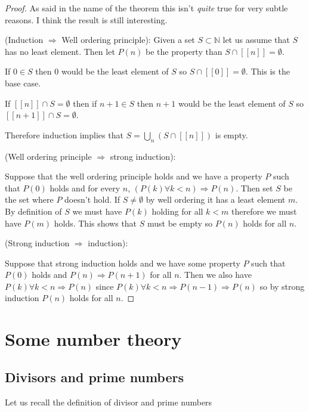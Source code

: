 \documentclass[
]{book}
\theoremstyle{definition}
\theoremstyle{definition}
\theoremstyle{definition}
\theoremstyle{definition}
\theoremstyle{remark}
\begin{document}
\begin{proof}
As said in the name of the theorem this isn't \emph{quite} true for very subtle reasons. I think the result is still interesting.

(Induction \(\Rightarrow\) Well ordering principle): Given a set \(S \subset \mathbb{N}\) let us assume that \(S\) has no least element. Then let \(P(n)\) be the property than \(S \cap [[n]]= \emptyset\).

If \(0 \in S\) then \(0\) would be the least element of \(S\) so \(S \cap [[0]]= \emptyset\). This is the base case.

If \([[n]] \cap S = \emptyset\) then if \(n+1 \in S\) then \(n+1\) would be the least element of \(S\) so \([[n+1]] \cap S = \emptyset\).

Therefore induction implies that \(S = \bigcup_n (S \cap [[n]])\) is empty.

(Well ordering principle \(\Rightarrow\) strong induction):

Suppose that the well ordering principle holds and we have a property \(P\) such that \(P(0)\) holds and for every \(n\), \((P(k) \forall k<n) \Rightarrow P(n)\). Then set \(S\) be the set where \(P\) doesn't hold. If \(S \neq \emptyset\) by well ordering it has a least element \(m\). By definition of \(S\) we must have \(P(k)\) holding for all \(k<m\) therefore we must have \(P(m)\) holds. This shows that \(S\) must be empty so \(P(n)\) holds for all \(n\).

(Strong induction \(\Rightarrow\) induction):

Suppose that strong induction holds and we have some property \(P\) such that \(P(0)\) holds and \(P(n) \Rightarrow P(n+1)\) for all \(n\). Then we also have \(P(k) \forall k< n \Rightarrow P(n)\) since \(P(k) \forall k < n \Rightarrow P(n-1) \Rightarrow P(n)\) so by strong induction \(P(n)\) holds for all \(n\).
\end{proof}

\chapter{Some number theory}\label{some-number-theory}

\section{Divisors and prime numbers}\label{divisors-and-prime-numbers}

Let us recall the definition of divisor and prime numbers
\end{document}
